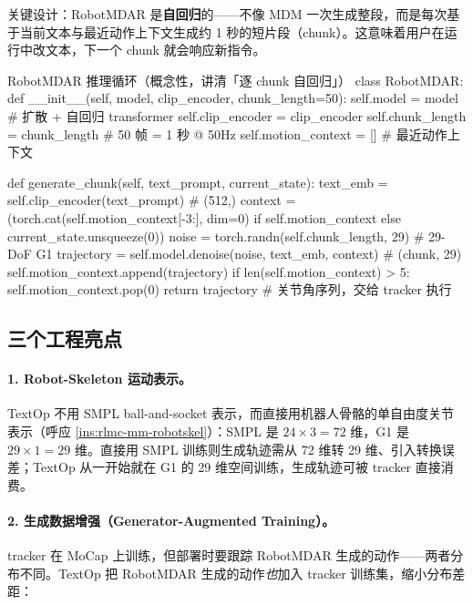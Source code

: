 关键设计：RobotMDAR 是\textbf{自回归}的——不像 MDM 一次生成整段，而是每次基于当前文本与最近动作上下文生成约 1 秒的短片段（chunk）。这意味着用户在运行中改文本，下一个 chunk 就会响应新指令。

\begin{codebox}[Python]{RobotMDAR 推理循环（概念性，讲清「逐 chunk 自回归」）}
class RobotMDAR:
    def __init__(self, model, clip_encoder, chunk_length=50):
        self.model = model                  # 扩散 + 自回归 transformer
        self.clip_encoder = clip_encoder
        self.chunk_length = chunk_length    # 50 帧 = 1 秒 @ 50Hz
        self.motion_context = []            # 最近动作上下文

    def generate_chunk(self, text_prompt, current_state):
        text_emb = self.clip_encoder(text_prompt)            # (512,)
        context = (torch.cat(self.motion_context[-3:], dim=0)
                   if self.motion_context else current_state.unsqueeze(0))
        noise = torch.randn(self.chunk_length, 29)           # 29-DoF G1
        trajectory = self.model.denoise(noise, text_emb, context)  # (chunk, 29)
        self.motion_context.append(trajectory)
        if len(self.motion_context) > 5:
            self.motion_context.pop(0)
        return trajectory                   # 关节角序列，交给 tracker 执行
\end{codebox}

\subsection{三个工程亮点}
\label{sec:rlmc-mm-textop-tricks}

\paragraph{1. Robot-Skeleton 运动表示。}TextOp 不用 SMPL ball-and-socket 表示，而直接用机器人骨骼的单自由度关节表示（呼应 \cref{ins:rlmc-mm-robotskel}）：SMPL 是 $24\times 3=72$ 维，G1 是 $29\times 1=29$ 维。直接用 SMPL 训练则生成轨迹需从 72 维转 29 维、引入转换误差；TextOp 从一开始就在 G1 的 29 维空间训练，生成轨迹可被 tracker 直接消费。

\paragraph{2. 生成数据增强（Generator-Augmented Training）。}tracker 在 MoCap 上训练，但部署时要跟踪 RobotMDAR 生成的动作——两者分布不同。TextOp 把 RobotMDAR 生成的动作\emph{也}加入 tracker 训练集，缩小分布差距：

